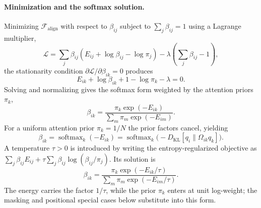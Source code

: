 \documentclass[11pt]{article}
\begin{document}
\paragraph{Minimization and the softmax solution.}
Minimizing $\mathcal{F}_{\text{align}}$ with respect to $\beta_{ij}$ subject to $\sum_j \beta_{ij} = 1$ using a Lagrange multiplier,
\begin{equation}
\mathcal{L} = \sum_j \beta_{ij}(E_{ij} + \log \beta_{ij} - \log \pi_j) - \lambda\left(\sum_j \beta_{ij} - 1\right),
\end{equation}
the stationarity condition $\partial \mathcal{L} / \partial \beta_{ik} = 0$ produces
\begin{equation}
E_{ik} + \log \beta_{ik} + 1 - \log \pi_k - \lambda = 0.
\end{equation}
Solving and normalizing gives the softmax form weighted by the attention priors $\pi_k$,
\begin{equation}
\beta_{ik} = \frac{\pi_k \exp(-E_{ik})}{\sum_m \pi_m \exp(-E_{im})}.
\label{eq:softmax_attention_general}
\end{equation}
For a uniform attention prior $\pi_k = 1/N$ the prior factors cancel, yielding
\begin{equation}
\boxed{\beta_{ik} = \operatorname{softmax}_k(-E_{ik}) = \operatorname{softmax}_k\big(-D_{\mathrm{KL}}[q_i \| \Omega_{ik} q_k]\big).}
\label{eq:mixture_softmax}
\end{equation}
A temperature $\tau>0$ is introduced by writing the entropy-regularized objective as $\sum_j\beta_{ij}E_{ij}+\tau\sum_j\beta_{ij}\log(\beta_{ij}/\pi_j)$. Its solution is
\begin{equation}
\beta_{ik}
= \frac{\pi_k\exp(-E_{ik}/\tau)}{\sum_m \pi_m\exp(-E_{im}/\tau)}.
\end{equation}
The energy carries the factor $1/\tau$, while the prior $\pi_k$ enters at unit log-weight; the masking and positional special cases below substitute into this form.
\end{document}
